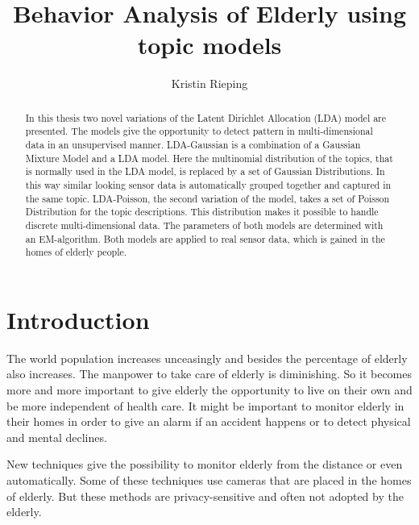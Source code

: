 \documentclass[11pt,a4paper]{article}
\title{Behavior Analysis of Elderly using topic models}
\author{Kristin Rieping}
\begin{document}
\maketitle
\pagebreak
\tableofcontents
\pagebreak

\begin{abstract}
In this thesis two novel variations of the Latent Dirichlet Allocation (LDA) model are presented. The models give the opportunity to detect pattern in multi-dimensional data in an unsupervised manner. LDA-Gaussian is a combination of a Gaussian Mixture Model and a LDA model. Here the multinomial distribution of the topics, that is normally used in the LDA model, is replaced by a set of Gaussian Distributions. In this way similar looking sensor data is automatically grouped together and captured in the same topic.
LDA-Poisson, the second variation of the model, takes a set of Poisson Distribution for the topic descriptions. This distribution makes it possible to handle discrete multi-dimensional data. The parameters of both models are determined with an EM-algorithm.
Both models are applied to real sensor data, which is gained in the homes of elderly people.


\end{abstract}


\section{Introduction}
The world population increases unceasingly and besides the percentage of elderly also increases. The manpower to take care of elderly is diminishing. So it becomes more and more important to give elderly the opportunity to live on their own and be more independent of health care. It might be important to monitor elderly in their homes in order to give an alarm if an accident happens or to detect physical and mental declines.

New techniques give the possibility to monitor elderly from the distance or even automatically. Some of these techniques use cameras that are placed in the homes of elderly. But these methods are privacy-sensitive and often not adopted by the elderly.
\end{document}
